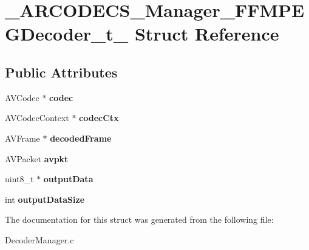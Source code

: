 \hypertarget{struct__ARCODECS__Manager__FFMPEGDecoder__t__}{}\section{\+\_\+\+A\+R\+C\+O\+D\+E\+C\+S\+\_\+\+Manager\+\_\+\+F\+F\+M\+P\+E\+G\+Decoder\+\_\+t\+\_\+ Struct Reference}
\label{struct__ARCODECS__Manager__FFMPEGDecoder__t__}
\subsection*{Public Attributes}
\begin{DoxyCompactItemize}
\item 
\hypertarget{struct__ARCODECS__Manager__FFMPEGDecoder__t___a54f960af3b215ad993feedca5dda5c2d}{}A\+V\+Codec $\ast$ {\bfseries codec}\label{struct__ARCODECS__Manager__FFMPEGDecoder__t___a54f960af3b215ad993feedca5dda5c2d}

\item 
\hypertarget{struct__ARCODECS__Manager__FFMPEGDecoder__t___ab35630e0b6d4d961106a3b031047ff1e}{}A\+V\+Codec\+Context $\ast$ {\bfseries codec\+Ctx}\label{struct__ARCODECS__Manager__FFMPEGDecoder__t___ab35630e0b6d4d961106a3b031047ff1e}

\item 
\hypertarget{struct__ARCODECS__Manager__FFMPEGDecoder__t___a13410d1f5c4992e7c9b507a632e4ef9e}{}A\+V\+Frame $\ast$ {\bfseries decoded\+Frame}\label{struct__ARCODECS__Manager__FFMPEGDecoder__t___a13410d1f5c4992e7c9b507a632e4ef9e}

\item 
\hypertarget{struct__ARCODECS__Manager__FFMPEGDecoder__t___ac84534612a21669b931a651698dbba1d}{}A\+V\+Packet {\bfseries avpkt}\label{struct__ARCODECS__Manager__FFMPEGDecoder__t___ac84534612a21669b931a651698dbba1d}

\item 
\hypertarget{struct__ARCODECS__Manager__FFMPEGDecoder__t___a44bd4d2dd5436480d25c27fd013c0b3d}{}uint8\+\_\+t $\ast$ {\bfseries output\+Data}\label{struct__ARCODECS__Manager__FFMPEGDecoder__t___a44bd4d2dd5436480d25c27fd013c0b3d}

\item 
\hypertarget{struct__ARCODECS__Manager__FFMPEGDecoder__t___a298ee2088fdb2f7798bce2c99bec22e0}{}int {\bfseries output\+Data\+Size}\label{struct__ARCODECS__Manager__FFMPEGDecoder__t___a298ee2088fdb2f7798bce2c99bec22e0}

\end{DoxyCompactItemize}


The documentation for this struct was generated from the following file\+:\begin{DoxyCompactItemize}
\item 
Decoder\+Manager.\+c\end{DoxyCompactItemize}
